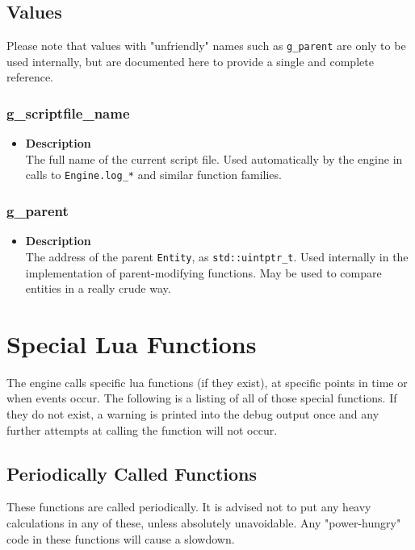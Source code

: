 \documentclass[12pt,a4paper]{article}
\begin{document}
\subsection{Values}

Please note that values with "unfriendly" names such as \texttt{g\_parent} are only to be used internally, but are documented here to provide a single and complete reference.

\subsubsection{g\_scriptfile\_name}
\begin{itemize}
	\item[]{\bf Description}
		\\ The full name of the current script file. Used automatically by the engine in calls to \texttt{Engine.log\_*} and similar function families.
\end{itemize}

\subsubsection{g\_parent}
\begin{itemize}
	\item[]{\bf Description}
		\\ The address of the parent \texttt{Entity}, as \texttt{std::uintptr\_t}. Used internally in the implementation of parent-modifying functions. May be used to compare entities in a really crude way.
\end{itemize}

\pagebreak
\section{Special Lua Functions}

The engine calls specific lua functions (if they exist), at specific points in time or when events occur. The following is a listing of all of those special functions.
If they do not exist, a warning is printed into the debug output once and any further attempts at calling the function will not occur.

\subsection{Periodically Called Functions}

These functions are called periodically. It is advised not to put any heavy calculations in any of these, unless absolutely unavoidable. Any "power-hungry" code in these functions will cause a slowdown.
\end{document}
